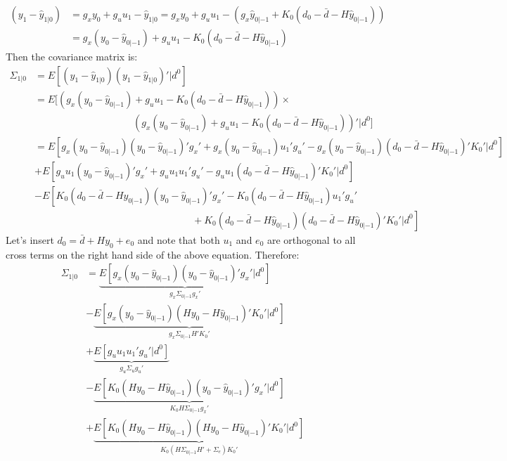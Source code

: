 \begin{enumerate}
\begingroup\vspace{-1\baselineskip}\small
\begin{align*}
(y_1 - \hat{y}_{1|0}) &= g_x y_0 + g_u u_1 - \hat{y}_{1|0} = g_x y_0 + g_u u_1 - \left( g_x \hat{y}_{0|-1} + K_0\left(d_0-\bar{d}-H\hat{y}_{0|-1}\right) \right)
\\
&=g_x \left(y_0 - \hat{y}_{0|-1} \right) + g_u u_1 - K_0 (d_0 - \bar{d} - H\hat{y}_{0|-1})
\end{align*}
Then the covariance matrix is:
\begin{align*}
\Sigma_{1|0} &= E\left[(y_1 - \hat{y}_{1|0})(y_1 - \hat{y}_{1|0})'|d^0\right]
\\
&=E\Bigg[(g_x (y_0 - \hat{y}_{0|-1} ) + g_u u_1 - K_0 (d_0 - \bar{d} - H\hat{y}_{0|-1})) \times
\\
&\qquad\qquad\qquad\qquad\qquad
(g_x (y_0 - \hat{y}_{0|-1}) + g_u u_1 - K_0 (d_0 - \bar{d} - H\hat{y}_{0|-1}))' |d^0 \Bigg]
\\
&=E\left[ g_x(y_0-\hat{y}_{0|-1})(y_0-\hat{y}_{0|-1})'g_x' + g_x(y_0-\hat{y}_{0|-1})u_1' g_u'- g_x(y_0-\hat{y}_{0|-1})(d_0 - \bar{d} - H\hat{y}_{0|-1})'K_0' |d^0 \right]
\\
&+ E\left[g_u u_1(y_0-\hat{y}_{0|-1})'g_x' + g_u u_1 u_1' g_u' - g_u u_1 (d_0 - \bar{d} - H\hat{y}_{0|-1})'K_0'|d^0 \right]
\\
&- E\left[K_0 (d_0 - \bar{d} - H\hat{y}_{0|-1})(y_0-\hat{y}_{0|-1})'g_x' - K_0 (d_0 - \bar{d} - H\hat{y}_{0|-1})u_1' g_u' \right.
\\ &\left. \qquad\qquad\qquad\qquad\qquad\qquad\qquad\qquad+ K_0 (d_0 - \bar{d} - H\hat{y}_{0|-1})(d_0 - \bar{d} - H\hat{y}_{0|-1})' K_0'  |d^0 \right]
\end{align*}
\endgroup
Let's insert \(d_0=\bar{d} + H y_0 + e_0\) and note that both \(u_1\) and \(e_0\) are orthogonal to all cross terms on the right hand side of the above equation.
Therefore:
\begin{align*}
\Sigma_{1|0} & =\underbrace{E\left[g_x(y_0-\hat{y}_{0|-1})(y_0-\hat{y}_{0|-1})'g_x'|d^0 \right]}_{g_x \Sigma_{0|-1}g_x'}
\\
&- \underbrace{E\left[g_x(y_0-\hat{y}_{0|-1})(H y_0 - H\hat{y}_{0|-1})'K_0'|d^0 \right]}_{g_x \Sigma_{0|-1}H'K_0'}
\\
&+ \underbrace{E\left[g_u u_1 u_1' g_u'|d^0 \right]}_{g_u \Sigma_u g_u'}
\\
&- \underbrace{E\left[K_0 (H y_0  - H\hat{y}_{0|-1})(y_0-\hat{y}_{0|-1})'g_x'|d^0 \right]}_{K_0 H \Sigma_{0|-1}g_x'}
\\
&+ \underbrace{E\left[K_0 (H y_0  - H\hat{y}_{0|-1})(H y_0 - H\hat{y}_{0|-1})' K_0'|d^0 \right]}_{K_0(H\Sigma_{0|-1}H' + \Sigma_e)K_0'}

\end{align*}
\end{enumerate}
